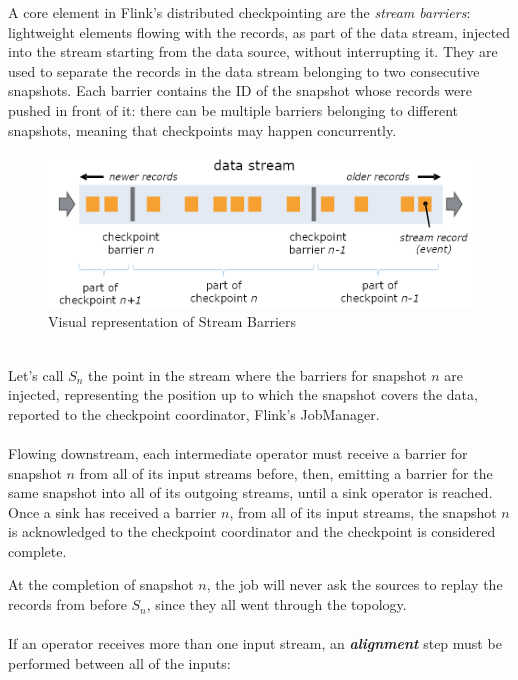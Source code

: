 A core element in Flink’s distributed checkpointing are the \textit{stream barriers}: lightweight elements flowing with the records, as part of the data stream, injected into the stream starting from the data source, without interrupting it. They are used to separate the records in the data stream belonging to two consecutive snapshots. Each barrier contains the ID of the snapshot whose records were pushed in front of it: there can be multiple barriers belonging to different snapshots, meaning that checkpoints may happen concurrently.
\\
\begin{figure}[!htb]
    \centering
    \includegraphics[width=1\linewidth]{Figures/stream_barriers}
    \caption{Visual representation of Stream Barriers}
    \label{fig:streambarriers}
\end{figure}
\\
Let's call $S_n$ the point in the stream where the barriers for snapshot $n$ are injected, representing the position up to which the snapshot covers the data, reported to the checkpoint coordinator, Flink’s JobManager.
\\\\
Flowing downstream, each intermediate operator must receive a barrier for snapshot $n$ from all of its input streams before, then, emitting a barrier for the same snapshot into all of its outgoing streams, until a sink operator is reached. Once a sink has received a barrier $n$, from all of its input streams, the snapshot $n$ is acknowledged to the checkpoint coordinator and the checkpoint is considered complete.

At the completion of snapshot $n$, the job will never ask the sources to replay the records from before $S_n$, since they all went through the topology.
\\\\

If an operator receives more than one input stream, an \textit{\textbf{alignment}} step must be performed between all of the inputs:

